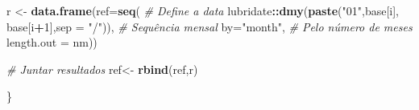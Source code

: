 \documentclass[12pt,a4paper]{article}
\newenvironment{Shaded}{\begin{snugshade}}{\end{snugshade}}
\newcommand{\CommentTok}[1]{\textcolor[rgb]{0.56,0.35,0.01}{\textit{#1}}}
\newcommand{\DataTypeTok}[1]{\textcolor[rgb]{0.13,0.29,0.53}{#1}}
\newcommand{\DecValTok}[1]{\textcolor[rgb]{0.00,0.00,0.81}{#1}}
\newcommand{\KeywordTok}[1]{\textcolor[rgb]{0.13,0.29,0.53}{\textbf{#1}}}
\newcommand{\NormalTok}[1]{#1}
\newcommand{\OperatorTok}[1]{\textcolor[rgb]{0.81,0.36,0.00}{\textbf{#1}}}
\newcommand{\StringTok}[1]{\textcolor[rgb]{0.31,0.60,0.02}{#1}}
\begin{document}
\begin{Shaded}
\begin{Highlighting}[]
\NormalTok{    r <-}\StringTok{ }\KeywordTok{data.frame}\NormalTok{(}\DataTypeTok{ref=}\KeywordTok{seq}\NormalTok{(}
      \CommentTok{# Define a data}
\NormalTok{      lubridate}\OperatorTok{::}\KeywordTok{dmy}\NormalTok{(}\KeywordTok{paste}\NormalTok{(}\StringTok{"01"}\NormalTok{,base[i],}
\NormalTok{                           base[i}\OperatorTok{+}\DecValTok{1}\NormalTok{],}\DataTypeTok{sep =} \StringTok{"/"}\NormalTok{)),}
      \CommentTok{# Sequência mensal}
      \DataTypeTok{by=}\StringTok{"month"}\NormalTok{,}
      \CommentTok{# Pelo número de meses}
      \DataTypeTok{length.out =}\NormalTok{ nm))}
  
    \CommentTok{# Juntar resultados}
\NormalTok{    ref<-}\StringTok{ }\KeywordTok{rbind}\NormalTok{(ref,r)}
  
\NormalTok{\}}


\end{Highlighting}
\end{Shaded}
\end{document}

